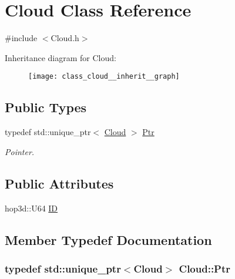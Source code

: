 \hypertarget{class_cloud}{\section{Cloud Class Reference}
\label{class_cloud}
}


{\ttfamily \#include $<$Cloud.\-h$>$}



Inheritance diagram for Cloud\-:\nopagebreak
\begin{figure}[H]
\begin{center}
\leavevmode
\texttt{[image: class\_cloud\_\_inherit\_\_graph]}
\end{center}
\end{figure}
\subsection*{Public Types}
\begin{DoxyCompactItemize}
\item 
typedef std\-::unique\-\_\-ptr$<$ \hyperlink{class_cloud}{Cloud} $>$ \hyperlink{class_cloud_a8460ff60db0a23f3679fc830db160e2a}{Ptr}
\begin{DoxyCompactList}\small\item\em Pointer. \end{DoxyCompactList}\end{DoxyCompactItemize}
\subsection*{Public Attributes}
\begin{DoxyCompactItemize}
\item 
hop3d\-::\-U64 \hyperlink{class_cloud_aa89d2de77505b1a09032fe8317d7703c}{I\-D}
\end{DoxyCompactItemize}


\subsection{Member Typedef Documentation}
\hypertarget{class_cloud_a8460ff60db0a23f3679fc830db160e2a}{
\subsubsection[{Ptr}]{\setlength{\rightskip}{0pt plus 5cm}typedef std\-::unique\-\_\-ptr$<${\bf Cloud}$>$ {\bf Cloud\-::\-Ptr}}}\label{class_cloud_a8460ff60db0a23f3679fc830db160e2a}


